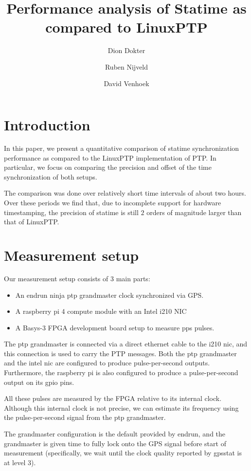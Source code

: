\documentclass{article}
\title{Performance analysis of Statime as compared to LinuxPTP}
\author{Dion Dokter \and Ruben Nijveld \and David Venhoek}
\begin{document}
\maketitle

\section{Introduction}

In this paper, we present a quantitative comparison of statime synchronization performance as compared to the LinuxPTP implementation of PTP. In particular, we focus on comparing the precision and offset of the time synchronization of both setups.

The comparison was done over relatively short time intervals of about two hours. Over these periods we find that, due to incomplete support for hardware timestamping, the precision of statime is still $2$ orders of magnitude larger than that of LinuxPTP.

\section{Measurement setup}

Our measurement setup consists of 3 main parts:
\begin{itemize}
    \item An endrun ninja ptp grandmaster clock synchronized via GPS.
    \item A raspberry pi 4 compute module with an Intel i210 NIC
    \item A Basys-3 FPGA development board setup to measure pps pulses.
\end{itemize}

The ptp grandmaster is connected via a direct ethernet cable to the i210 nic, and this connection is used to carry the PTP messages. Both the ptp grandmaster and the intel nic are configured to produce pulse-per-second outputs. Furthermore, the raspberry pi is also configured to produce a pulse-per-second output on its gpio pins.

All these pulses are measured by the FPGA relative to its internal clock. Although this internal clock is not precise, we can estimate its frequency using the pulse-per-second signal from the ptp grandmaster.

The grandmaster configuration is the default provided by endrun, and the grandmaster is given time to fully lock onto the GPS signal before start of measurement (specifically, we wait until the clock quality reported by gpsstat is at level 3).
\end{document}
